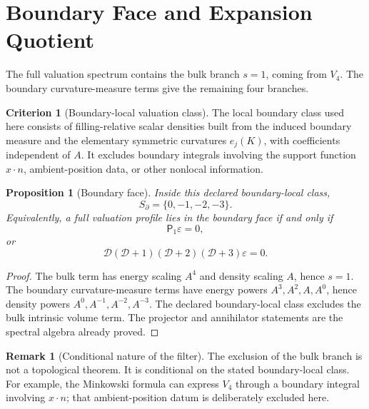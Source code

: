 \documentclass[aps,prd,preprint,onecolumn,nofootinbib,superscriptaddress,showkeys]{revtex4-2}
\numberwithin{equation}{section}
\theoremstyle{definition}
\newtheorem{criterion}{Criterion}[section]
\newtheorem{remark}{Remark}[section]
\theoremstyle{plain}
\newtheorem{proposition}{Proposition}[section]
\newcommand{\Dil}{\mathscr D}
\begin{document}
\section{Boundary Face and Expansion Quotient}

The full valuation spectrum contains the bulk branch \(s=1\), coming from \(V_4\).  The boundary curvature-measure terms give the remaining four branches.

\begin{criterion}[Boundary-local valuation class]
The local boundary class used here consists of filling-relative scalar densities built from the induced boundary measure and the elementary symmetric curvatures \(e_j(K)\), with coefficients independent of \(A\).  It excludes boundary integrals involving the support function \(x\cdot n\), ambient-position data, or other nonlocal information.
\end{criterion}

\begin{proposition}[Boundary face]
Inside this declared boundary-local class,
\begin{equation}
S_\partial=\{0,-1,-2,-3\}.
\end{equation}
Equivalently, a full valuation profile lies in the boundary face if and only if
\begin{equation}
\mathsf P_1\varepsilon=0,
\end{equation}
or
\begin{equation}
\Dil(\Dil+1)(\Dil+2)(\Dil+3)\varepsilon=0.
\end{equation}
\end{proposition}

\begin{proof}
The bulk term has energy scaling \(A^4\) and density scaling \(A\), hence \(s=1\).  The boundary curvature-measure terms have energy powers \(A^3,A^2,A,A^0\), hence density powers \(A^0,A^{-1},A^{-2},A^{-3}\).  The declared boundary-local class excludes the bulk intrinsic volume term.  The projector and annihilator statements are the spectral algebra already proved.
\end{proof}

\begin{remark}[Conditional nature of the filter]
The exclusion of the bulk branch is not a topological theorem.  It is conditional on the stated boundary-local class.  For example, the Minkowski formula can express \(V_4\) through a boundary integral involving \(x\cdot n\); that ambient-position datum is deliberately excluded here.
\end{remark}
\end{document}
